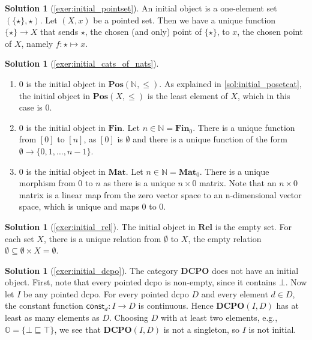 \documentclass[a4paper,11pt, oneside,titlepage=false]{scrbook}
\theoremstyle{plain}
\theoremstyle{definition}
\newtheorem{solution}[thm]{Solution}
\newcommand{\Catb}[1]{\mathbf{#1}}
\newcommand{\POS}{\Catb{Pos}}
\newcommand{\DCPO}{\Catb{DCPO}}
\newcommand{\MAT}{\Catb{Mat}}
\newcommand{\SKELFINSET}{\Catb{Fin}}
\newcommand{\REL}{\Catb{Rel}}
\newcommand{\CHom}[3]{{#1}(#2,#3)}
\newcommand{\NN}{\ensuremath{\mathbb{N}}}
\newcommand{\const}{\ensuremath{\mathsf{const}}}
\begin{document}
\begin{solution}[\cref{exer:initial_pointset}]\label{sol:initial_pointset}
	An initial object is a one-element set $ (\{ \star \}, \star) $. Let $ (X, x) $ be a pointed set. Then we have a unique function $ \{\star\} \to X $ that sends $ \star $, the chosen (and only) point of $ \{ \star \} $, to $ x $, the chosen point of $ X $, namely $ f: \star \mapsto x $.
\end{solution}

\begin{solution}[\cref{exer:initial_cats_of_nats}]\label{sol:initial_cats_of_nats}
\begin{enumerate}
	\item $0$ is the initial object in $\POS(\NN,\leq)$. As explained in \cref{sol:initial_posetcat}, the initial object in $\POS(X,\leq)$ is the least element of $X$, which in this case is $0$.
	\item $0$ is the initial object in $\SKELFINSET$. Let $n \in \NN = \SKELFINSET_0$. There is a unique function from $[0]$ to $[n]$, as $[0]$ is $\emptyset$ and there is a unique function of the form $\emptyset \to \{0, 1, \dots, n-1\}$.
	\item $0$ is the initial object in $\MAT$. Let $n \in \NN = \MAT_0$. There is a unique morphism from $0$ to $n$ as there is a unique $n \times 0$ matrix.
     Note that an $n \times 0$ matrix is a linear map from the zero vector space to an n-dimensional vector space, which is unique and maps 0 to 0.
\end{enumerate}
\end{solution}

\begin{solution}[\cref{exer:initial_rel}] \label{sol:initial_rel}
	The initial object in $\REL$ is the empty set. For each set $X$, there is a unique relation from $\emptyset$ to $X$, the empty relation $\emptyset \subseteq \emptyset \times X = \emptyset$.
\end{solution}

\begin{solution}[\cref{exer:initial_dcpo}]\label{sol:initial_dcpo}
  The category $\DCPO$ does not have an initial object.
  First, note that every pointed dcpo is non-empty, since it contains $\bot$.
  Now let $I$ be any pointed dcpo.
  For every pointed dcpo $D$ and every element $d \in D$, the constant function
  $\const_d : I \to D$ is continuous.
  Hence $\CHom{\DCPO}{I}{D}$ has at least as many elements as $D$.
  Choosing $D$ with at least two elements, e.g., $\mathbb{O} = \{\bot \sqsubseteq \top\}$,
  we see that $\CHom{\DCPO}{I}{D}$ is not a singleton, so $I$ is not initial.
\end{solution}
\end{document}
